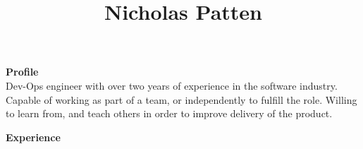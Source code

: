\documentclass[a4paper,12pt,final,sans]{memoir}
\title{\vspace{-2.5cm} \textbf{\textsf{\color{head} Nicholas Patten}}\\}
\date{\vspace{-7.0em}}
\begin{document}
 
\maketitle %
\thispagestyle{empty} %

\vspace{2mm}
\textbf{\textsf{\color{head} \large{Profile} }} \\[0.3em]
Dev-Ops engineer with over two years of experience in the software industry. Capable of working as part of a team, or independently to fulfill the role. Willing to learn from, and teach others in order to improve delivery of the product. \\


\vskip-2mm

\textbf{\textsf{\color{head} \large{Experience} }}\\[-1.5em]
\end{document}
